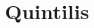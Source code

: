 \documentclass[0main]{subfiles}
\begin{document}
\chapter{Quintilis}



\bigskip
\bigskip
\section{}

\subsection{}



\subsection{}



\bigskip
\subsection{}



\bigskip
\bigskip
\section{}

\subsection{}



\subsection{}



\bigskip
\subsection{}



\bigskip
\bigskip
\section{}
\end{document}
